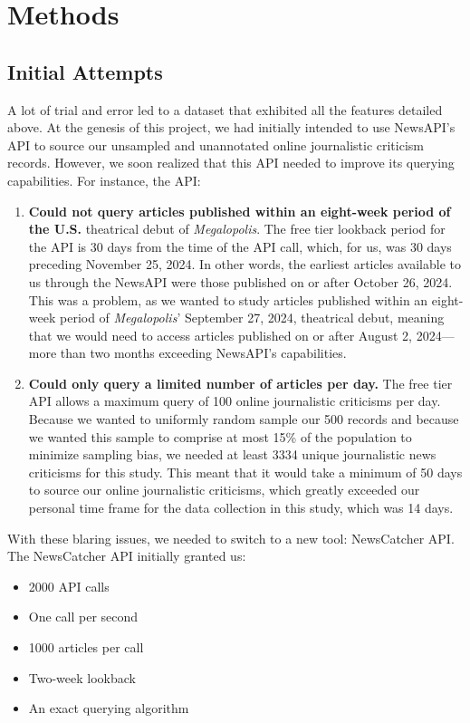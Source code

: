\documentclass[letterpaper]{article} %
\begin{document}
\section{Methods}

\subsection{Initial Attempts}

A lot of trial and error led to a dataset that exhibited all the features detailed above. At the genesis of this project, we had initially intended to use NewsAPI’s API to source our unsampled and unannotated online journalistic criticism records. However, we soon realized that this API needed to improve its querying capabilities. For instance, the API:

\begin{enumerate}
    \item \textbf{Could not query articles published within an eight-week period of the U.S.} theatrical debut of \textit{Megalopolis}. The free tier lookback period for the API is 30 days from the time of the API call, which, for us, was 30 days preceding November 25, 2024. In other words, the earliest articles available to us through the NewsAPI were those published on or after October 26, 2024. This was a problem, as we wanted to study articles published within an eight-week period of \textit{Megalopolis}' September 27, 2024, theatrical debut, meaning that we would need to access articles published on or after August 2, 2024—more than two months exceeding NewsAPI's capabilities.
    
    \item \textbf{Could only query a limited number of articles per day.} The free tier API allows a maximum query of 100 online journalistic criticisms per day. Because we wanted to uniformly random sample our 500 records and because we wanted this sample to comprise at most 15\% of the population to minimize sampling bias, we needed at least 3334 unique journalistic news criticisms for this study. This meant that it would take a minimum of 50 days to source our online journalistic criticisms, which greatly exceeded our personal time frame for the data collection in this study, which was 14 days.
\end{enumerate}

With these blaring issues, we needed to switch to a new tool: NewsCatcher API. The NewsCatcher API initially granted us:

\begin{itemize}
    \item 2000 API calls
    \item One call per second
    \item 1000 articles per call
    \item Two-week lookback
    \item An exact querying algorithm
\end{itemize}
\end{document}
